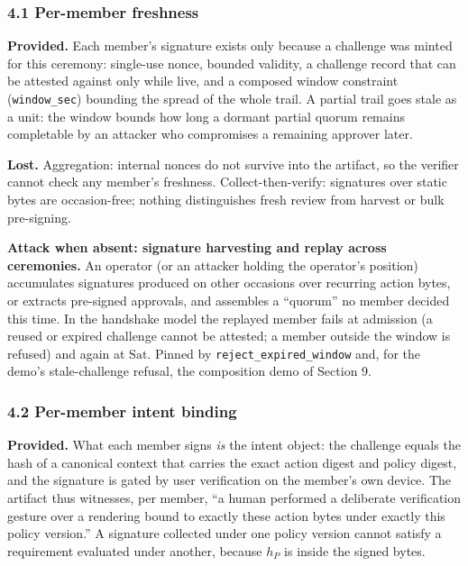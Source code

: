\documentclass[
  11pt,
]{article}
\begin{document}
\subsubsection{4.1 Per-member freshness}\label{per-member-freshness}

\textbf{Provided.} Each member's signature exists only because a
challenge was minted for this ceremony: single-use nonce, bounded
validity, a challenge record that can be attested against only while
live, and a composed window constraint (\texttt{window\_sec}) bounding
the spread of the whole trail. A partial trail goes stale as a unit: the
window bounds how long a dormant partial quorum remains completable by
an attacker who compromises a remaining approver later.

\textbf{Lost.} Aggregation: internal nonces do not survive into the
artifact, so the verifier cannot check any member's freshness.
Collect-then-verify: signatures over static bytes are occasion-free;
nothing distinguishes fresh review from harvest or bulk pre-signing.

\textbf{Attack when absent: signature harvesting and replay across
ceremonies.} An operator (or an attacker holding the operator's
position) accumulates signatures produced on other occasions over
recurring action bytes, or extracts pre-signed approvals, and assembles
a ``quorum'' no member decided this time. In the handshake model the
replayed member fails at admission (a reused or expired challenge cannot
be attested; a member outside the window is refused) and again at
$\mathrm{Sat}$. Pinned by \texttt{reject\_expired\_window} and, for the
demo's stale-challenge refusal, the composition demo of Section 9.

\subsubsection{4.2 Per-member intent binding}\label{per-member-intent-binding}

\textbf{Provided.} What each member signs \emph{is} the intent object:
the challenge equals the hash of a canonical context that carries the
exact action digest and policy digest, and the signature is gated by
user verification on the member's own device. The artifact thus
witnesses, per member, ``a human performed a deliberate verification
gesture over a rendering bound to exactly these action bytes under
exactly this policy version.'' A signature collected under one policy
version cannot satisfy a requirement evaluated under another, because
$h_P$ is inside the signed bytes.
\end{document}
